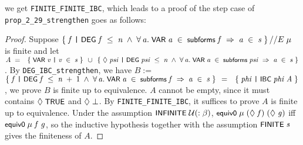 \documentclass[letterpaper]{article}
\renewcommand{\HOLConst}[1]{{\textsf{\upshape\small #1}}}
\renewcommand{\HOLinline}[1]{\ensuremath{#1}}
\begin{document}
we get \texttt{FINITE_FINITE_IBC}, which leads to a proof of the step case of \texttt{prop_2_29_strengthen} goes as follows: 
\begin{proof}
Suppose \HOLinline{\HOLTokenLeftbrace{}\HOLBoundVar{f}\;\HOLTokenBar{}\;\HOLConst{DEG}\;\HOLBoundVar{f}\;\HOLSymConst{\HOLTokenLeq{}}\;\HOLFreeVar{n}\;\HOLSymConst{\HOLTokenConj{}}\;\HOLSymConst{\HOLTokenForall{}}\HOLBoundVar{a}.\;\HOLConst{VAR}\;\HOLBoundVar{a}\;\HOLSymConst{\HOLTokenIn{}}\;\HOLConst{subforms}\;\HOLBoundVar{f}\;\HOLSymConst{\HOLTokenImp{}}\;\HOLBoundVar{a}\;\HOLSymConst{\HOLTokenIn{}}\;\HOLFreeVar{s}\HOLTokenRightbrace{}\HOLSymConst{//E}\;\HOLFreeVar{\ensuremath{\mu}}}
 is finite and let \HOLinline{\HOLFreeVar{A}\;\HOLSymConst{=}\\
\;\;\HOLTokenLeftbrace{}\HOLConst{VAR}\;\HOLBoundVar{v}\;\HOLTokenBar{}\;\HOLBoundVar{v}\;\HOLSymConst{\HOLTokenIn{}}\;\HOLFreeVar{s}\HOLTokenRightbrace{}\;\HOLSymConst{\HOLTokenUnion{}}\;\HOLTokenLeftbrace{}\HOLSymConst{\ensuremath{\Diamond}}\;\HOLBoundVar{psi}\;\HOLTokenBar{}\;\HOLConst{DEG}\;\HOLBoundVar{psi}\;\HOLSymConst{\HOLTokenLeq{}}\;\HOLFreeVar{n}\;\HOLSymConst{\HOLTokenConj{}}\;\HOLSymConst{\HOLTokenForall{}}\HOLBoundVar{a}.\;\HOLConst{VAR}\;\HOLBoundVar{a}\;\HOLSymConst{\HOLTokenIn{}}\;\HOLConst{subforms}\;\HOLBoundVar{psi}\;\HOLSymConst{\HOLTokenImp{}}\;\HOLBoundVar{a}\;\HOLSymConst{\HOLTokenIn{}}\;\HOLFreeVar{s}\HOLTokenRightbrace{}}. By \texttt{DEG_IBC_strengthen}, we have $B:=$\HOLinline{\HOLTokenLeftbrace{}\HOLBoundVar{f}\;\HOLTokenBar{}\;\HOLConst{DEG}\;\HOLBoundVar{f}\;\HOLSymConst{\HOLTokenLeq{}}\;\HOLFreeVar{n}\;\HOLSymConst{\ensuremath{+}}\;\HOLNumLit{1}\;\HOLSymConst{\HOLTokenConj{}}\;\HOLSymConst{\HOLTokenForall{}}\HOLBoundVar{a}.\;\HOLConst{VAR}\;\HOLBoundVar{a}\;\HOLSymConst{\HOLTokenIn{}}\;\HOLConst{subforms}\;\HOLBoundVar{f}\;\HOLSymConst{\HOLTokenImp{}}\;\HOLBoundVar{a}\;\HOLSymConst{\HOLTokenIn{}}\;\HOLFreeVar{s}\HOLTokenRightbrace{}\;\HOLSymConst{=}\\
\;\;\HOLTokenLeftbrace{}\HOLBoundVar{phi}\;\HOLTokenBar{}\;\HOLConst{IBC}\;\HOLBoundVar{phi}\;\HOLFreeVar{A}\HOLTokenRightbrace{}}, we prove $B$ is finite up to equivalence. $A$ cannot be empty, since it must contains \HOLinline{\HOLSymConst{\ensuremath{\Diamond}}\;\HOLConst{TRUE}} and \HOLinline{\HOLSymConst{\ensuremath{\Diamond}}\;\HOLSymConst{\ensuremath{\bot}}}. By \texttt{FINITE_FINITE_IBC}, it suffices to prove $A$ is finite up to equivalence. Under the assumption \HOLinline{\HOLConst{INFINITE}\;\ensuremath{\cal{U}}(:\ensuremath{\beta})}, \HOLinline{\HOLConst{equiv0}\;\HOLFreeVar{\ensuremath{\mu}}\;(\HOLSymConst{\ensuremath{\Diamond}}\;\HOLFreeVar{f})\;(\HOLSymConst{\ensuremath{\Diamond}}\;\HOLFreeVar{g})} iff \HOLinline{\HOLConst{equiv0}\;\HOLFreeVar{\ensuremath{\mu}}\;\HOLFreeVar{f}\;\HOLFreeVar{g}}, so the inductive hypothesis together  with the assumption \HOLinline{\HOLConst{FINITE}\;\HOLFreeVar{s}} gives the finiteness of $A$.%
\end{proof}
\end{document}

